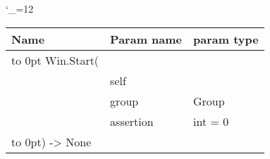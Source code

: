 \begingroup \catcode`\_=12 \tt
\begin{tabular}{lll}
\toprule
\textrm{Name}&\textrm{Param name}&\textrm{param type}\\
\midrule
\hbox to 0pt {Win.Start(\hss}\\
& self\\
& group & Group\\
& assertion & int = 0\\
\hbox to 0pt{) -> None\hss}\\
\bottomrule
\end{tabular}
\endgroup
